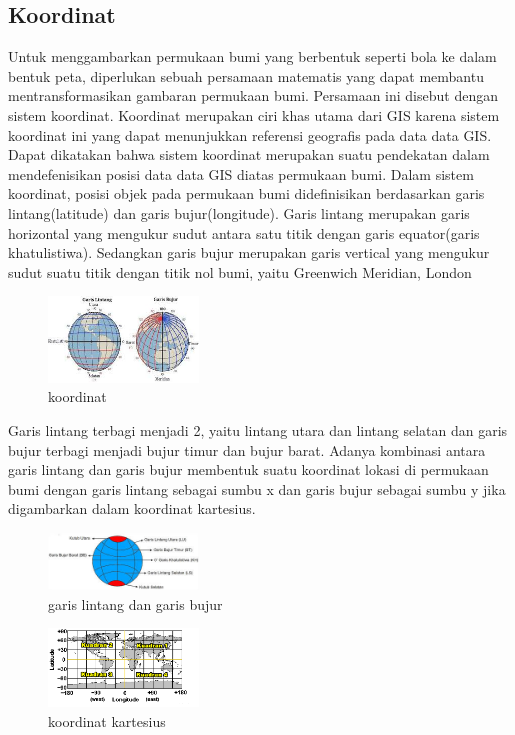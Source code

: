 \subsection{Koordinat}
Untuk menggambarkan permukaan bumi yang berbentuk seperti bola ke dalam bentuk peta, diperlukan sebuah persamaan matematis yang dapat membantu mentransformasikan gambaran permukaan bumi. Persamaan ini disebut dengan sistem koordinat. Koordinat merupakan ciri khas utama dari GIS karena sistem koordinat ini yang dapat menunjukkan referensi geografis pada data data GIS. Dapat dikatakan bahwa sistem koordinat merupakan suatu pendekatan dalam mendefenisikan posisi data data GIS diatas permukaan bumi.\hfill\break
Dalam sistem koordinat, posisi objek pada permukaan bumi didefinisikan berdasarkan garis lintang(latitude) dan garis bujur(longitude). Garis lintang merupakan garis horizontal yang mengukur sudut antara satu titik dengan garis equator(garis khatulistiwa). Sedangkan garis bujur merupakan garis vertical yang mengukur sudut suatu titik dengan titik nol bumi, yaitu Greenwich Meridian, London\hfill\break
\begin{figure}[H]
	\includegraphics[width=4cm]{figures/1174096/1/koordinat2.jpg}
	\centering
	\caption{koordinat}
\end{figure}
Garis lintang terbagi menjadi 2, yaitu lintang utara dan lintang selatan dan garis bujur terbagi menjadi bujur timur dan bujur barat. Adanya kombinasi antara garis lintang dan garis bujur membentuk suatu koordinat lokasi di permukaan bumi dengan garis lintang sebagai sumbu x dan garis bujur sebagai sumbu y jika digambarkan dalam koordinat kartesius.
\begin{figure}[H]
	\includegraphics[width=4cm]{figures/1174096/1/lintangbujur.jpg}
	\centering
	\caption{garis lintang dan garis bujur}
\end{figure}
\begin{figure}[H]
	\includegraphics[width=4cm]{figures/1174096/1/Lintangbujurkuadran.png}
	\centering
	\caption{koordinat kartesius}
\end{figure}
